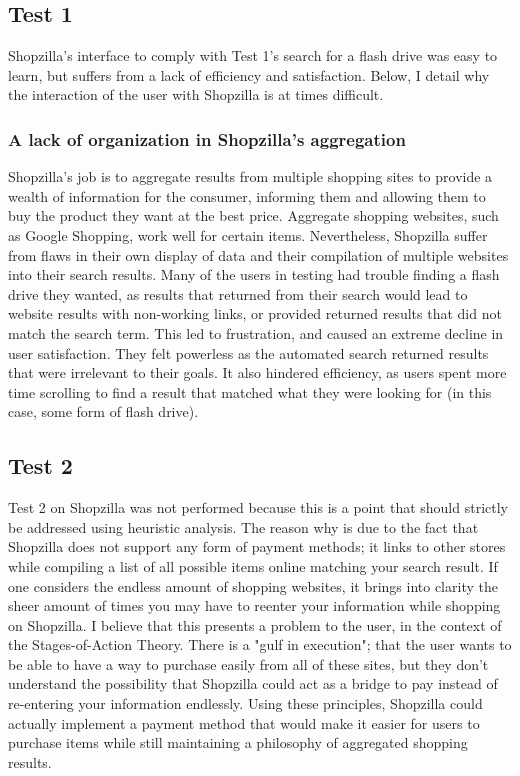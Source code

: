 \documentclass[11pt, oneside]{article}   	%
\begin{document}
\subsection{Test 1}
Shopzilla's interface to comply with Test 1's search for a flash drive was easy to learn, but suffers from a lack of efficiency and satisfaction. Below, I detail why the interaction of the user with Shopzilla is at times difficult.
\subsubsection{A lack of organization in Shopzilla's aggregation}
Shopzilla's job is to aggregate results from multiple shopping sites to provide a wealth of information for the consumer, informing them and allowing them to buy the product they want at the best price. Aggregate shopping websites, such as Google Shopping, work well for certain items. Nevertheless, Shopzilla suffer from flaws in their own display of data and their compilation of multiple websites into their search results. Many of the users in testing had trouble finding a flash drive they wanted, as results that returned from their search would lead to website results with non-working links, or provided returned results that did not match the search term. This led to frustration, and caused an extreme decline in user satisfaction. They felt powerless as the automated search returned results that were irrelevant to their goals. It also hindered efficiency, as users spent more time scrolling to find a result that matched what they were looking for (in this case, some form of flash drive).
\subsection{Test 2}
Test 2 on Shopzilla was not performed because this is a point that should strictly be addressed using heuristic analysis. The reason why is due to the fact that Shopzilla does not support any form of payment methods; it links to other stores while compiling a list of all possible items online matching your search result. If one considers the endless amount of shopping websites, it brings into clarity the sheer amount of times you may have to reenter your information while shopping on Shopzilla. I believe that this presents a problem to the user, in the context of the Stages-of-Action Theory. There is a "gulf in execution"; that the user wants to be able to have a way to purchase easily from all of these sites, but they don't understand the possibility that Shopzilla could act as a bridge to pay instead of re-entering your information endlessly. Using these principles, Shopzilla could actually implement a payment method that would make it easier for users to purchase items while still maintaining a philosophy of aggregated shopping results. 
\end{document}
